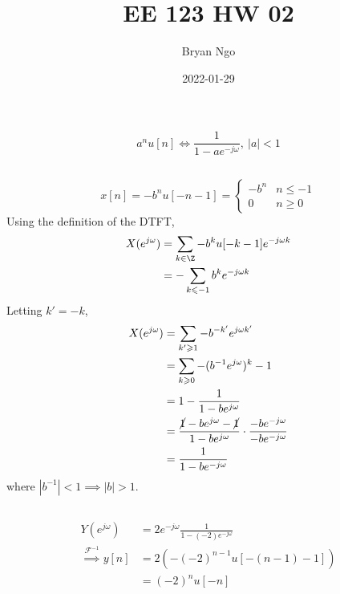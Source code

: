 \documentclass{article}
\title{EE 123 HW 02}
\author{Bryan Ngo}
\date{2022-01-29}
\begin{document}
\maketitle

\setcounter{section}{2}

\section{}

\begin{equation}
    a^n u[n] \iff \frac{1}{1 - ae^{-j \omega}}, \ |a| < 1
\end{equation}

\subsection{}

\begin{equation}
    x[n] = -b^n u[-n - 1] =
    \begin{cases}
        -b^n & n \leqslant -1 \\
        0 & n \geqslant 0
    \end{cases}
\end{equation}
Using the definition of the DTFT,
\begin{align}
    X(e^{j \omega}) &= \sum_{k \in \Z} -b^k u[-k - 1] e^{-j \omega k} \\
    &= -\sum_{k \leqslant -1} b^k e^{-j \omega k}
\end{align}
Letting \(k' = -k\),
\begin{align}
    X(e^{j \omega}) &= \sum_{k' \geqslant 1} -b^{-k'} e^{j \omega k'} \\
    &= \sum_{k \geqslant 0} -(b^{-1} e^{j \omega})^k - 1 \\
    &= 1 - \frac{1}{1 - b e^{j \omega}} \\
    &= \frac{\cancel{1} - b e^{j \omega} - \cancel{1}}{1 - b e^{j \omega}} \cdot \frac{-b e^{-j \omega}}{-b e^{-j \omega}} \\
    &= \frac{1}{1 - b e^{-j \omega}}
\end{align}
where \(|b^{-1}| < 1 \implies |b| > 1\).

\subsection{}

\begin{align}
    Y(e^{j \omega}) &= 2e^{-j \omega} \frac{1}{1 - (-2) e^{-j \omega}} \\
    \overset{\mathcal{F}^{-1}}{\implies} y[n] &= 2 (-(-2)^{n - 1} u[-(n - 1) - 1]) \\
    &= (-2)^n u[-n]
\end{align}
\end{document}
